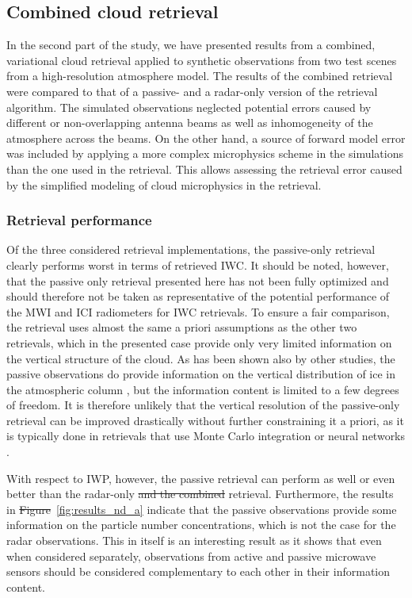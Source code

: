 \documentclass[journal abbreviation, manuscript]{copernicus}
\providecommand{\DIFadd}[1]{{\protect\color{blue}\uwave{#1}}} %
\providecommand{\DIFdel}[1]{{\protect\color{red}\sout{#1}}}                      %
\providecommand{\DIFaddbegin}{} %
\providecommand{\DIFaddend}{} %
\providecommand{\DIFdelbegin}{} %
\providecommand{\DIFdelend}{} %
\begin{document}
\subsection{Combined cloud retrieval}

In the second part of the study, we have presented results from a combined,
variational cloud retrieval applied to synthetic observations from two test
scenes from a high-resolution atmosphere model. The results of the combined
retrieval were compared to that of a passive- and a radar-only version of the
retrieval algorithm. The simulated observations \DIFaddbegin \DIFadd{assumed an airborne viewing
geometry and therefore }\DIFaddend neglected potential errors caused by different or
non-overlapping antenna beams as well as inhomogeneity of the atmosphere across
the beams. On the other hand, a source of forward model error was included by
applying a more complex microphysics scheme in the simulations than the one used
in the retrieval. This allows assessing the retrieval error caused by the
simplified modeling of cloud microphysics in the retrieval.

\subsubsection{Retrieval performance}

Of the three considered retrieval implementations, the passive-only retrieval
clearly performs worst in terms of retrieved IWC. It should be noted, however,
that the passive only retrieval presented here has not been fully optimized and
should therefore not be taken as representative of the potential performance of
the MWI and ICI radiometers for IWC retrievals. To ensure a fair comparison, the
retrieval uses almost the same a priori assumptions as the other two retrievals,
which in the presented case provide only very limited information on the
vertical structure of the cloud. As has been shown also by other studies, the
passive observations do provide information on the vertical distribution of ice
in the atmospheric column \citep{wang17, grutzun18}, but the information content
is limited to a few degrees of freedom. It is therefore unlikely that the
vertical resolution of the passive-only retrieval can be improved drastically
without further constraining it a priori, as it is typically done in retrievals
that use Monte Carlo integration or neural networks \citep{pfreundschuh18}.

With respect to IWP, however, the passive retrieval can perform as well or even
better than the radar-only \DIFdelbegin \DIFdel{and the combined }\DIFdelend retrieval. Furthermore, the results in
\DIFdelbegin \DIFdel{Figure}\DIFdelend \DIFaddbegin \DIFadd{Fig.}\DIFaddend ~\ref{fig:results_nd_a} indicate that the passive observations provide some
information on the particle number concentrations, which is not the case for the
radar observations. This in itself is an interesting result as it shows that
even when considered separately, observations from active and passive microwave
sensors should be considered complementary to each other in their information
content.
\end{document}
